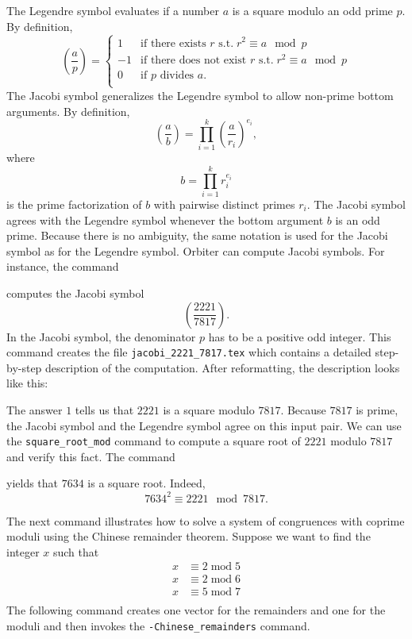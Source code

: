 \bigskip

The Legendre symbol evaluates if a number $a$ is a square modulo an odd prime $p$. 
By definition,  
$$
\left(
\frac{a}{p}
\right) = 
\left\{
\begin{array}{cl}
	1 & \mbox{if there exists $r$ s.t.} \; r^2 \equiv a \mod p \\ 
	-1 & \mbox{if there does not exist $r$ s.t.} \; r^2 \equiv a \mod p \\ 
	0 & \mbox{if $p$ divides $a$.}\\
	\end{array}
\right.
$$
The Jacobi symbol 
generalizes the Legendre symbol to allow non-prime bottom arguments.
By definition,
$$
\left(
\frac{a}{b}
\right) 
= 
\prod_{i=1}^k 
\left(
\frac{a}{r_i}
\right)^{e_i},
$$
where 
$$
b = \prod_{i=1}^k r_i^{e_i}
$$
is the prime factorization of $b$ with pairwise distinct primes $r_i.$
The Jacobi symbol agrees with the Legendre symbol 
whenever the bottom argument $b$ is an odd prime.
Because there is no ambiguity, 
the same notation is used for the Jacobi symbol as for the Legendre symbol.
Orbiter can compute Jacobi symbols. 
For instance, the command 


computes the Jacobi symbol 
$$
\left(
\frac{2221}{7817}
\right).
$$
In the Jacobi symbol, 
the denominator $p$ has to be a positive odd integer.
This command creates the file \verb'jacobi_2221_7817.tex' 
which contains a detailed step-by-step description 
of the computation.
After reformatting, the description looks like this:



The answer $1$ tells us that $2221$ is a square modulo $7817.$
Because $7817$ is prime, the Jacobi symbol and the Legendre symbol agree on this input pair. 
We can use the \verb'square_root_mod' 
command 
to compute a square root of $2221$ modulo $7817$ and verify this fact.
The command 


yields that $7634$ is a square root. Indeed,
$$
7634^2 \equiv 2221 \mod 7817.
$$

\bigskip

The next command illustrates how to solve a system of congruences with coprime moduli 
using the Chinese remainder theorem.
Suppose we want to find the integer $x$ such that 
\begin{eqnarray*}
x & \equiv 2 \; \mbox{mod} \; 5\\
x & \equiv 2 \; \mbox{mod} \; 6\\
x & \equiv 5 \; \mbox{mod} \; 7\\
\end{eqnarray*}
The following command creates one vector for the remainders and one for the moduli and then 
invokes the \verb'-Chinese_remainders' command.

